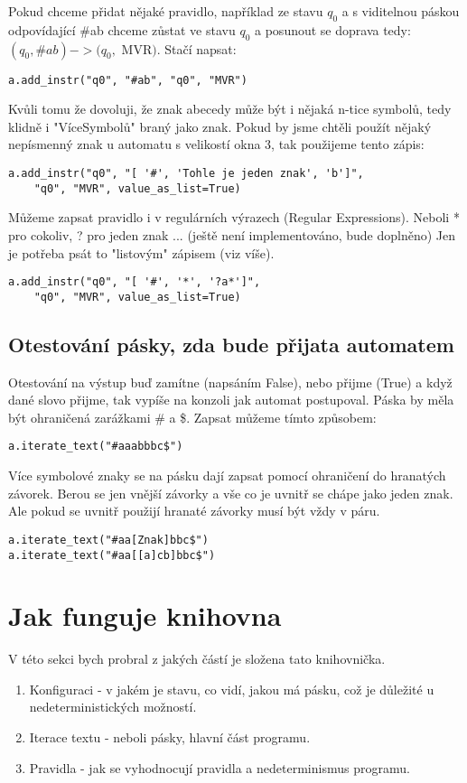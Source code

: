 \documentclass{article}
\begin{document}
Pokud chceme přidat nějaké pravidlo,
například ze stavu $q_0$ a s viditelnou páskou odpovídající \#ab chceme zůstat ve stavu $q_0$
a posunout se doprava tedy: $(q_0, \#ab) -> (q_0,$ MVR$)$.
Stačí napsat:
\begin{lstlisting}
a.add_instr("q0", "#ab", "q0", "MVR")
\end{lstlisting}
Kvůli tomu že dovoluji, že znak abecedy může být i nějaká n-tice symbolů, tedy klidně i "VíceSymbolů" braný jako znak.
Pokud by jsme chtěli použít nějaký nepísmenný znak u automatu s velikostí okna 3, tak použijeme tento zápis:
\begin{lstlisting}
a.add_instr("q0", "[ '#', 'Tohle je jeden znak', 'b']",
	"q0", "MVR", value_as_list=True)
\end{lstlisting}
Můžeme zapsat pravidlo i v regulárních výrazech (Regular Expressions).
Neboli * pro cokoliv, ? pro jeden znak ... (ještě není implementováno, bude doplněno)
Jen je potřeba psát to "listovým" zápisem (viz víše).
\begin{lstlisting}
a.add_instr("q0", "[ '#', '*', '?a*']",
	"q0", "MVR", value_as_list=True)
\end{lstlisting}

\subsection{Otestování pásky, zda bude přijata automatem}
Otestování na výstup buď zamítne (napsáním False), nebo přijme (True) a když dané slovo přijme,
tak vypíše na konzoli jak automat postupoval.
Páska by měla být ohraničená zarážkami \# a \$.
Zapsat můžeme tímto způsobem:
\begin{lstlisting}
a.iterate_text("#aaabbbc$")
\end{lstlisting}
Více symbolové znaky se na pásku dají zapsat pomocí ohraničení do hranatých závorek.
Berou se jen vnější závorky a vše co je uvnitř se chápe jako jeden znak.
Ale pokud se uvnitř použijí hranaté závorky musí být vždy v páru.
\begin{lstlisting}
a.iterate_text("#aa[Znak]bbc$")
a.iterate_text("#aa[[a]cb]bbc$")
\end{lstlisting}

\section{Jak funguje knihovna}
V této sekci bych probral z jakých částí je složena tato knihovnička.
\begin{enumerate}
	\item Konfiguraci - v jakém je stavu, co vidí, jakou má pásku, což je důležité u nedeterministických možností.
	\item Iterace textu - neboli pásky, hlavní část programu.
	\item Pravidla - jak se vyhodnocují pravidla a nedeterminismus programu.
\end{enumerate}
\end{document}
